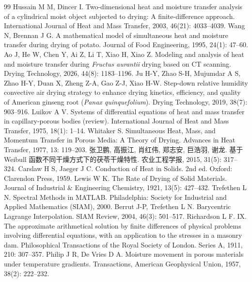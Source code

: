 \documentclass[bwprint]{cumcmthesis}
\begin{document}
\begin{thebibliography}{99}
\normalsize
\setlength{\itemsep}{1.5pt plus 0.5pt}
\setlength{\parskip}{0pt}
 Hussain M M, Dincer I. Two-dimensional heat and moisture transfer
analysis of a cylindrical moist object subjected to drying: A finite-difference approach.
International Journal of Heat and Mass Transfer, 2003, 46(21): 4033--4039.
 Wang N, Brennan J G. A mathematical model of simultaneous heat and
moisture transfer during drying of potato. Journal of Food Engineering, 1995, 24(1): 47--60.
 Ao J, He W, Chen Y, Ai Z, Li T, Xiao H, Xiao Z. Modeling and
analysis of heat and moisture transfer during \textit{Fructus aurantii} drying based on
CT scanning. Drying Technology, 2026, 44(8): 1183--1196.
 Ju H-Y, Zhao S-H, Mujumdar A S, Zhao H-Y, Duan X, Zheng Z-A,
Gao Z-J, Xiao H-W. Step-down relative humidity convective air drying strategy to enhance
drying kinetics, efficiency, and quality of American ginseng root
(\textit{Panax quinquefolium}). Drying Technology, 2019, 38(7): 903--916.
 Luikov A V. Systems of differential equations of heat and mass transfer
in capillary-porous bodies (review). International Journal of Heat and Mass Transfer,
1975, 18(1): 1--14.
 Whitaker S. Simultaneous Heat, Mass, and Momentum Transfer in Porous
Media: A Theory of Drying. Advances in Heat Transfer, 1977, 13: 119--203.
 张卫鹏, 高振江, 肖红伟, 郑志安, 巨浩羽, 谢龙.
基于 Weibull 函数不同干燥方式下的茯苓干燥特性. 农业工程学报, 2015, 31(5): 317--324.
 Carslaw H S, Jaeger J C. Conduction of Heat in Solids. 2nd ed.
Oxford: Clarendon Press, 1959.
 Lewis W K. The Rate of Drying of Solid Materials.
Journal of Industrial \& Engineering Chemistry, 1921, 13(5): 427--432.
 Trefethen L N. Spectral Methods in MATLAB.
Philadelphia: Society for Industrial and Applied Mathematics (SIAM), 2000.
 Berrut J-P, Trefethen L N. Barycentric Lagrange Interpolation.
SIAM Review, 2004, 46(3): 501--517.
 Richardson L F. IX. The approximate arithmetical solution by finite
differences of physical problems involving differential equations, with an application to
the stresses in a masonry dam. Philosophical Transactions of the Royal Society of London.
Series A, 1911, 210: 307--357.
 Philip J R, De Vries D A. Moisture movement in porous materials under
temperature gradients. Transactions, American Geophysical Union, 1957, 38(2): 222--232.
\end{thebibliography}
\end{document}
